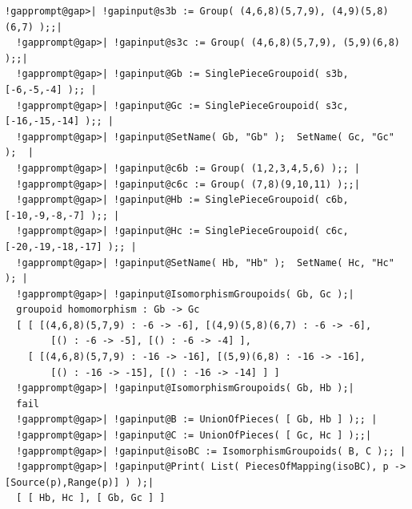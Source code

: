 \documentclass[a4paper,11pt]{report}
\begin{document}
{{\begin{Verbatim}[commandchars=!@|,fontsize=\small,frame=single,label=Example]
  !gapprompt@gap>| !gapinput@s3b := Group( (4,6,8)(5,7,9), (4,9)(5,8)(6,7) );;|
  !gapprompt@gap>| !gapinput@s3c := Group( (4,6,8)(5,7,9), (5,9)(6,8) );;|
  !gapprompt@gap>| !gapinput@Gb := SinglePieceGroupoid( s3b, [-6,-5,-4] );; |
  !gapprompt@gap>| !gapinput@Gc := SinglePieceGroupoid( s3c, [-16,-15,-14] );; |
  !gapprompt@gap>| !gapinput@SetName( Gb, "Gb" );  SetName( Gc, "Gc" );  |
  !gapprompt@gap>| !gapinput@c6b := Group( (1,2,3,4,5,6) );; |
  !gapprompt@gap>| !gapinput@c6c := Group( (7,8)(9,10,11) );;|
  !gapprompt@gap>| !gapinput@Hb := SinglePieceGroupoid( c6b, [-10,-9,-8,-7] );; |
  !gapprompt@gap>| !gapinput@Hc := SinglePieceGroupoid( c6c, [-20,-19,-18,-17] );; |
  !gapprompt@gap>| !gapinput@SetName( Hb, "Hb" );  SetName( Hc, "Hc" ); |
  !gapprompt@gap>| !gapinput@IsomorphismGroupoids( Gb, Gc );|
  groupoid homomorphism : Gb -> Gc
  [ [ [(4,6,8)(5,7,9) : -6 -> -6], [(4,9)(5,8)(6,7) : -6 -> -6], 
        [() : -6 -> -5], [() : -6 -> -4] ], 
    [ [(4,6,8)(5,7,9) : -16 -> -16], [(5,9)(6,8) : -16 -> -16], 
        [() : -16 -> -15], [() : -16 -> -14] ] ]
  !gapprompt@gap>| !gapinput@IsomorphismGroupoids( Gb, Hb );|
  fail
  !gapprompt@gap>| !gapinput@B := UnionOfPieces( [ Gb, Hb ] );; |
  !gapprompt@gap>| !gapinput@C := UnionOfPieces( [ Gc, Hc ] );;|
  !gapprompt@gap>| !gapinput@isoBC := IsomorphismGroupoids( B, C );; |
  !gapprompt@gap>| !gapinput@Print( List( PiecesOfMapping(isoBC), p -> [Source(p),Range(p)] ) );|
  [ [ Hb, Hc ], [ Gb, Gc ] ]
  
\end{Verbatim}
 }

 }

  
\end{document}
